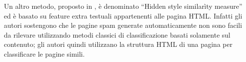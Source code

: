 Un altro metodo, proposto in \cite{DBLP:conf:airweb:UrvoyLF06}, è denominato ``Hidden style similarìty measure'' ed è basato su feature extra testuali appartenenti alle pagina HTML. Infatti gli autori sostengono che le pagine spam generate automaticamente non sono facili da rilevare utilizzando metodi classici di classificazione basati solamente sul contenuto; gli autori quindi utilizzano la struttura HTML di una pagina per classificare le pagine simili.

